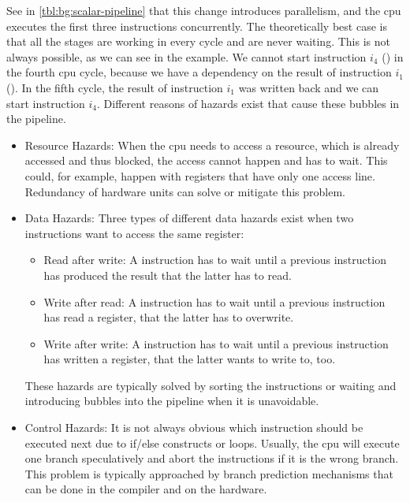 See in \cref{tbl:bg:scalar-pipeline} that this change introduces parallelism, and the \ac{cpu} executes the first three instructions concurrently.
The theoretically best case is that all the stages are working in every cycle and are never waiting.
This is not always possible, as we can see in the example.
We cannot start instruction $i_4$ () in the fourth \ac{cpu} cycle, because we have a dependency on the result of instruction $i_1$ ().
In the fifth cycle, the result of instruction $i_1$ was written back and we can start instruction $i_4$.
Different reasons of hazards exist that cause these bubbles in the pipeline.
\begin{itemize}
    \item Resource Hazards:
        When the \ac{cpu} needs to access a resource, which is already accessed and thus blocked, the access cannot happen and has to wait.
        This could, for example, happen with registers that have only one access line.
        Redundancy of hardware units can solve or mitigate this problem.
    \item Data Hazards:
        Three types of different data hazards exist when two instructions want to access the same register:
        \begin{itemize}
            \item Read after write: A instruction has to wait until a previous instruction has produced the result that the latter has to read.
            \item Write after read: A instruction has to wait until a previous instruction has read a register, that the latter has to overwrite.
            \item Write after write: A instruction has to wait until a previous instruction has written a register, that the latter wants to write to, too.
        \end{itemize}
        These hazards are typically solved by sorting the instructions or waiting and introducing bubbles into the pipeline when it is unavoidable.
    \item Control Hazards:
        It is not always obvious which instruction should be executed next due to if/else constructs or loops.
        Usually, the \ac{cpu} will execute one branch speculatively and abort the instructions if it is the wrong branch.
        This problem is typically approached by branch prediction mechanisms that can be done in the compiler and on the hardware.
\end{itemize}

